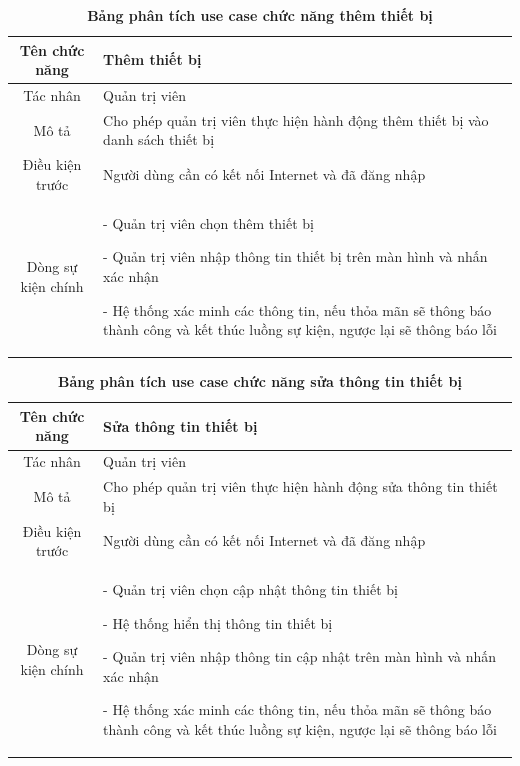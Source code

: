   \begin{table}[H]
    \caption{\bfseries \fontsize{12pt}{0pt}\selectfont Bảng phân tích use case chức năng thêm thiết bị}
    \centering
    \begin{tabularx}{0.9\textwidth}{|c|X|}
      \hline
      \textbf{Tên chức năng} & \textbf{Thêm thiết bị} \\
      \hline
      Tác nhân & Quản trị viên \\
      \hline
      Mô tả & Cho phép quản trị viên thực hiện hành động thêm thiết bị vào danh sách thiết bị\\
      \hline
      Điều kiện trước & Người dùng cần có kết nối Internet và đã đăng nhập \\
      \hline
      Dòng sự kiện chính & 
        - Quản trị viên chọn thêm thiết bị

        - Quản trị viên nhập thông tin thiết bị trên màn hình và nhấn xác nhận

        - Hệ thống xác minh các thông tin, nếu thỏa mãn sẽ thông báo thành công và kết thúc luồng sự kiện, ngược lại 
        sẽ thông báo lỗi           
        \\
      \hline
    \end{tabularx}
  \end{table}

  \begin{table}[H]
    \caption{\bfseries \fontsize{12pt}{0pt}\selectfont Bảng phân tích use case chức năng sửa thông tin thiết bị}
    \centering
    \begin{tabularx}{0.9\textwidth}{|c|X|}
      \hline
      \textbf{Tên chức năng} & \textbf{Sửa thông tin thiết bị} \\
      \hline
      Tác nhân & Quản trị viên \\
      \hline
      Mô tả & Cho phép quản trị viên thực hiện hành động sửa thông tin thiết bị \\
      \hline
      Điều kiện trước & Người dùng cần có kết nối Internet và đã đăng nhập \\
      \hline
      Dòng sự kiện chính & 
        - Quản trị viên chọn cập nhật thông tin thiết bị

        - Hệ thống hiển thị thông tin thiết bị

        - Quản trị viên nhập thông tin cập nhật trên màn hình và nhấn xác nhận

        - Hệ thống xác minh các thông tin, nếu thỏa mãn sẽ thông báo thành công và kết thúc luồng sự kiện, ngược lại 
        sẽ thông báo lỗi           
        \\
      \hline
    \end{tabularx}
  \end{table}

